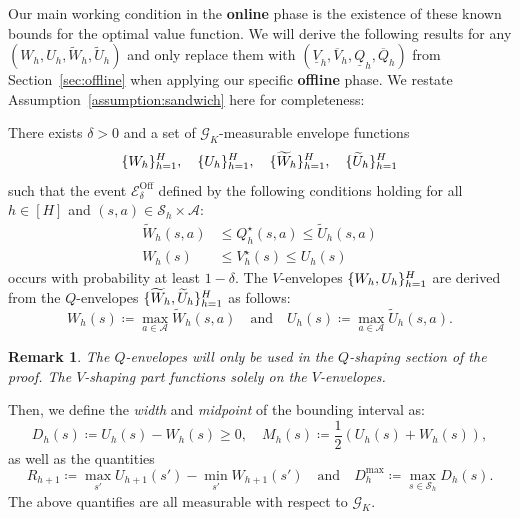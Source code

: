 \documentclass[twoside]{article}
\newtheorem{remark}{Remark}
\DeclarePairedDelimiter{\crl}{\{}{\}}
\newcommand{\lowq}{\widetilde{W}} %
\newcommand{\highq}{\widetilde{U}} %
\newcommand{\lowv}{W} %
\newcommand{\highv}{U} %
\newcommand{\ohighv}{\overline{V}} %
\newcommand{\olowv}{\underline{V}} %
\newcommand{\ohighq}{\overline{Q}} %
\newcommand{\olowq}{\underline{Q}} %
\newcommand{\sandwich}{bounding interval }
\begin{document}
Our main working condition in the \textbf{online} phase is the existence of these known bounds for the optimal value function. We will derive the following results for any $(\lowv_{h},\highv_{h}, \lowq_{h}, \highq_{h})$ and only replace them with $(\olowv_h, \ohighv_h, \olowq_{h}, \ohighq_{h})$ from Section~\ref{sec:offline} when applying our specific \textbf{offline} phase. We restate Assumption~\ref{assumption:sandwich} here for completeness:

There exists $\delta>0$ and a set of $\mathcal{G}_K$-measurable envelope functions 
\[
\crl{\lowv_{h}}_{h=1}^{H}, \quad \crl{\highv_{h}}_{h=1}^{H}, \quad \crl{\lowq_h}_{h=1}^{H}, \quad \crl{\highq_h}_{h=1}^{H}
\]
such that the event $\mathcal{E}^{\mathrm{Off}}_\delta$ defined by the following conditions holding for all $h \in [H]$ and $(s,a) \in \mathcal{S}_h \times \mathcal{A}$:
\begin{align}
 \lowq_h(s,a) &\leq Q_h^\star(s,a) \leq \highq_h(s,a) \label{eq:q_sandwich_appendix} \\
 \lowv_{h}(s) &\leq V_h^\star(s) \leq \highv_{h}(s) \label{eq:v_sandwich_appendix}
\end{align}
occurs with probability at least $1-\delta$. The $V$-envelopes $\crl{\lowv_{h}, \highv_{h}}_{h=1}^{H}$ are derived from the $Q$-envelopes $\crl{\lowq_{h}, \highq_{h}}_{h=1}^{H}$ as follows:
\[
\lowv_{h}(s) \coloneqq \max_{a \in \mathcal{A}} \lowq_h(s,a) \quad \text{and} \quad \highv_{h}(s) \coloneqq \max_{a \in \mathcal{A}} \highq_h(s,a).
\]
\begin{remark}
The $Q$-envelopes will only be used in the $Q$-shaping section of the proof. The $V$-shaping part functions solely on the $V$-envelopes.
\end{remark}

\noindent
Then, we define the \emph{width} and \emph{midpoint} of the \sandwich{} as:
\begin{equation}\label{eq:def_width_midpoint}
D_h(s) \coloneqq \highv_{h}(s) - \lowv_{h}(s) \ge 0, \quad M_h(s) \coloneqq \frac{1}{2} (\highv_{h}(s) + \lowv_{h}(s) ),
\end{equation}
as well as the quantities
\begin{equation}\label{eq:def_width_max}
R_{h+1}\coloneqq\max_{s'}\highv_{h+1}(s')-\min_{s'}\lowv_{h+1}(s')\quad\text{and}\quad D_{h}^{\max} \coloneqq \max_{s \in \mathcal{S}_h} D_h(s).
\end{equation}
The above quantifies are all measurable with respect to  $\mathcal{G}_K$. 
\end{document}
